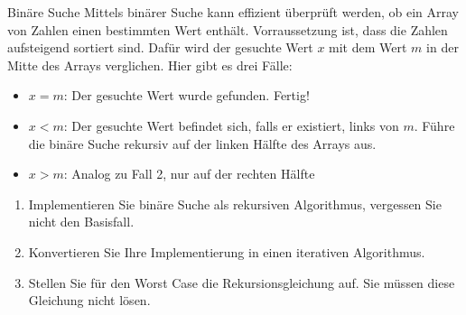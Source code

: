 \documentclass[11pt,a4paper]{article}
\begin{document}
\begin{aufgabe}{3}{Binäre Suche}
Mittels binärer Suche kann effizient überprüft werden, ob ein Array von Zahlen einen bestimmten Wert enthält.
Vorraussetzung ist, dass die Zahlen aufsteigend sortiert sind.
Dafür wird der gesuchte Wert $x$ mit dem Wert $m$ in der Mitte des Arrays verglichen. Hier gibt es drei Fälle:
\vspace{-3mm}
\begin{itemize}
    \item $x = m$: Der gesuchte Wert wurde gefunden. Fertig!
    \item $x < m$: Der gesuchte Wert befindet sich, falls er existiert, links von $m$. Führe die binäre Suche rekursiv auf der linken Hälfte des Arrays aus.
    \item $x > m$: Analog zu Fall 2, nur auf der rechten Hälfte
\end{itemize}
\begin{enumerate}
    \item Implementieren Sie binäre Suche als rekursiven Algorithmus, vergessen Sie nicht den Basisfall.
    \item Konvertieren Sie Ihre Implementierung in einen iterativen Algorithmus.
    \item Stellen Sie für den Worst Case die Rekursionsgleichung auf. Sie müssen diese Gleichung nicht lösen.
\end{enumerate}
    
\end{aufgabe}
\end{document}

